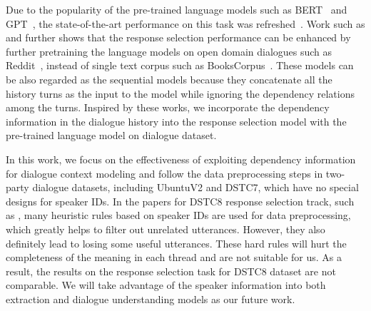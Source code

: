 Due to the popularity of the pre-trained language models such as BERT~\cite{DevlinCLT19} and GPT~\cite{radford2018improving}, the state-of-the-art performance on this task was refreshed~\cite{vig2019comparison}. Work such as \cite{abs-1908-04812} and \cite{humeau2019poly} further shows that the response selection performance can be enhanced by further pretraining the language models on open domain dialogues such as Reddit~\cite{abs-1904-06472}, instead of single text corpus such as BooksCorpus~\cite{ZhuKZSUTF15}. These models can be also regarded as the sequential models because they concatenate all the history turns as the input to the model while ignoring the dependency relations among the turns. Inspired by these works, we incorporate the dependency information in the dialogue history into the response selection model with the pre-trained language model on dialogue dataset.

In this work, we focus on the effectiveness of exploiting dependency information for dialogue context modeling and follow the data preprocessing steps in two-party dialogue datasets, including UbuntuV2 and DSTC7, which have no special designs for speaker IDs. In the papers for DSTC8 response selection track, such as \cite{abs-2004-01940}, many heuristic rules based on speaker IDs are used for data preprocessing, which greatly helps to filter out unrelated utterances. However, they also definitely lead to losing some useful utterances. These hard rules will hurt the completeness of the meaning in each thread and are not suitable for us. As a result, the results on the response selection task for DSTC8 dataset are not comparable.
We will take advantage of the speaker information into both extraction and dialogue understanding models as our future work.





